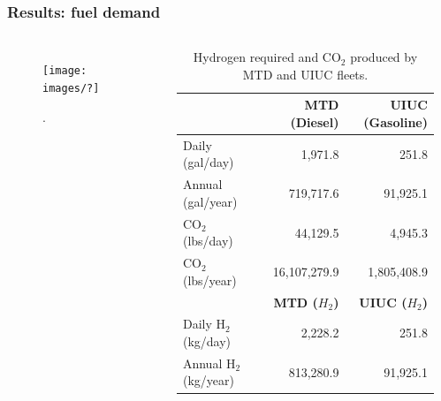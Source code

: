 \begin{frame}
\frametitle{Results: fuel demand}
\begin{columns}
    \column[t]{5cm}
	\begin{figure}[htbp!]
		\begin{center}
			\texttt{[image: images/?]}
		\end{center}
		\caption{.}
	\end{figure}

	\column[t]{5cm}
	\begin{table}[!htb]
		\centering
	    \caption{Hydrogen required and CO$_2$ produced by \gls{MTD} and \gls{UIUC} fleets.}
		\begin{tabular}{l|rr}
		\hline
	       & \textbf{MTD (Diesel)}   & \textbf{UIUC (Gasoline)}  \\ \hline
	       Daily (gal/day)    & 1,971.8        & 251.8            \\
	       Annual (gal/year)    & 719,717.6      & 91,925.1         \\ 
	    CO$_2$ (lbs/day)   & 44,129.5       & 4,945.3          \\
	    CO$_2$ (lbs/year)  & 16,107,279.9   & 1,805,408.9      \\ \hline
	       & \textbf{MTD ($H_2$)}   & \textbf{UIUC ($H_2$)}  \\ \hline
	    Daily H$_2$ (kg/day)    & 2,228.2        & 251.8            \\
	    Annual H$_2$ (kg/year)   & 813,280.9      & 91,925.1         \\\hline
		\end{tabular}
	    \label{tab:h2req}
	\end{table}
\end{columns}
\end{frame}



